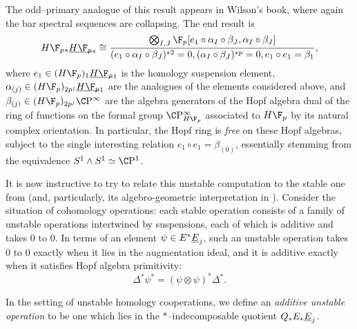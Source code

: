\begin{remark}
The odd--primary analogue of this result appears in Wilson's book, where again the bar spectral sequences are collapsing.  The end result is \[H\F_p{}_* \OS{H\F_p}{*} \cong \frac{\bigotimes_{I, J} \F_p[e_1 \circ \alpha_I \circ \beta_J, \alpha_I \circ \beta_J]}{(e_1 \circ \alpha_I \circ \beta_J)^{\ast 2} = 0, (\alpha_I \circ \beta_J)^{\ast p} = 0, e_1 \circ e_1 = \beta_1},\] where $e_1 \in (H\F_p)_1 \OS{H\F_p}{1}$ is the homology suspension element, $\alpha_{(j)} \in (H\F_p)_{2p^j} \OS{H\F_p}{1}$ are the analogues of the elements considered above, and $\beta_{(j)} \in (H\F_p)_{2p^j} \CP^\infty$ are the algebra generators of the Hopf algebra dual of the ring of functions on the formal group $\CP^\infty_{H\F_p}$ associated to $H\F_p$ by its natural complex orientation.  In particular, the Hopf ring is \emph{free} on these Hopf algebras, subject to the single interesting relation $e_1 \circ e_1 = \beta_{(0)}$, essentially stemming from the equivalence $S^1 \sm S^1 \simeq \CP^1$.
\end{remark}

It is now instructive to try to relate this unstable computation to the stable one from  (and, particularly, its algebro-geometric interpretation in ).  Consider the situation of cohomology operations: each stable operation consists of a family of unstable operations intertwined by suspensions, each of which is additive and takes $0$ to $0$.  In terms of an element $\psi \in E^* \underline{\smash{E}}_{j}$, such an unstable operation takes $0$ to $0$ exactly when it lies in the augmentation ideal, and it is additive exactly when it satisfies Hopf algebra primitivity: \[\Delta^* \psi^* = (\psi \otimes \psi)^* \Delta^*.\]
\begin{definition}
In the setting of unstable homology cooperations, we define an \textit{additive unstable operation} to be one which lies in the $\ast$--indecomposable quotient $Q_* E_* \underline{\smash{E}}_{j}$.
\end{definition}

